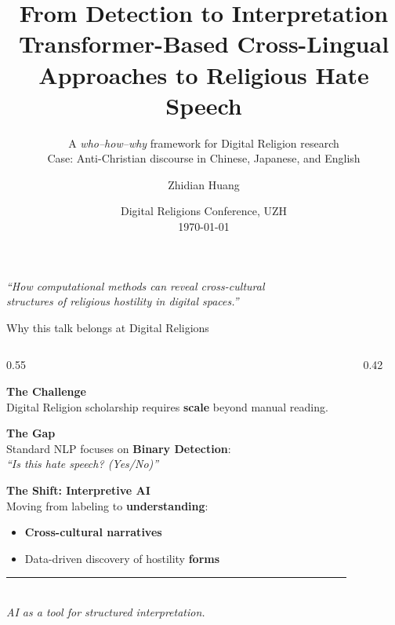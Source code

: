 \documentclass[aspectratio=169,10pt]{beamer}
\title[Cross-Lingual Religious Hate Speech]{%
  From Detection to Interpretation\\
  \large Transformer-Based Cross-Lingual Approaches to Religious Hate Speech}
\subtitle{A \emph{who--how--why} framework for Digital Religion research\\
  Case: Anti-Christian discourse in Chinese, Japanese, and English}
\author{Zhidian Huang}
\institute{University of Zurich · Department of Computational Linguistics}
\date{Digital Religions Conference, UZH\\ \today}
\newcommand{\emphc}[1]{\textcolor{uzhaccent}{\textbf{#1}}}
\newcommand{\keyword}[1]{\textcolor{uzhblue}{\textbf{#1}}}
\begin{document}

\begin{frame}[plain]
  \titlepage
  \vspace{-0.5em}
  \begin{center}\small
  \textit{``How computational methods can reveal cross-cultural\\
  structures of religious hostility in digital spaces.''}
  \end{center}
\end{frame}

\begin{frame}{Why this talk belongs at Digital Religions}
  \begin{columns}[T,onlytextwidth]
    \begin{column}{0.55\textwidth}
      \small
      
      \keyword{The Challenge}\\
      Digital Religion scholarship requires \keyword{scale} beyond manual reading.
      \vspace{0.8em}

      \keyword{The Gap}\\
      Standard NLP focuses on \keyword{Binary Detection}:\\
      \quad \textit{``Is this hate speech? (Yes/No)''}
      \vspace{0.8em}

      \keyword{The Shift: Interpretive AI}\\
      Moving from labeling to \keyword{understanding}:
      \begin{itemize}
        \item \emphc{Cross-cultural narratives}
        \item Data-driven discovery of hostility \keyword{forms}
      \end{itemize}
      
      \vspace{0.5em}
      \centering
      \rule{0.5\textwidth}{0.4pt}\\
      \vspace{0.3em}
      \footnotesize \textit{AI as a tool for structured interpretation.}
    \end{column}

    \begin{column}{0.42\textwidth}
      \centering\footnotesize
      \vspace{1em}
\end{column}
\end{columns}
\end{frame}
\end{document}
